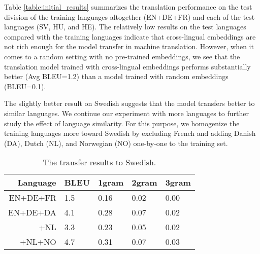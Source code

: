 \documentclass[11pt,a4paper]{article}
\begin{document}
Table \ref{table:initial_results} summarizes the translation performance on the test division of the training languages altogether (EN+DE+FR) and each of the test languages (SV, HU, and HE). 
The relatively low results on the test languages compared with the training languages indicate that cross-lingual embeddings are not rich enough for the model transfer in machine translation.
However, when it comes to a random setting with no pre-trained embeddings, we see that the translation model trained with cross-lingual embeddings performs substantially better (Avg BLEU=1.2) than a model trained with random embeddings (BLEU=0.1).


The slightly better result on Swedish suggests that the model transfers better to similar languages. 
We continue our experiment with more languages to further study the effect of language similarity. 
For this purpose, we homogenize the training languages more toward Swedish by excluding French and adding Danish (DA), Dutch (NL), and Norwegian (NO) one-by-one to the training set. 

\begin{table}
 \centering
 \begin{tabular}{r|llll}
 \hline
 Language & BLEU & 1gram & 2gram & 3gram \\ [0.25ex]
 \hline\hline
 EN+DE+FR & 1.5 & 0.16 & 0.02 & 0.00 \\
 \hline
 EN+DE+DA & 4.1 & 0.28 & 0.07 & 0.02 \\
 +NL & 3.3 & 0.23 & 0.05 & 0.02 \\
 +NL+NO & 4.7 & 0.31 & 0.07 & 0.03 \\
 \hline
 \end{tabular}
 \caption{The transfer results to Swedish.} %
 \label{table:language_similarity}
\end{table}
\end{document}
